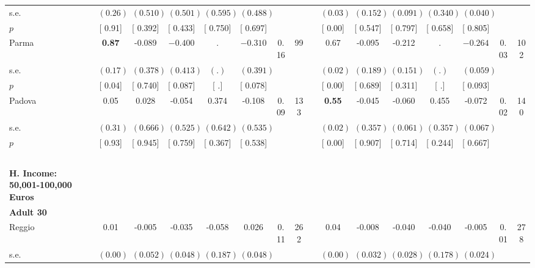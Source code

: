 \begin{longtable}{L{8em} c c c c c c c p{1em} c c c c c c c}
\quad \quad \quad \quad s.e.& $ (     0.26)$ & $ (    0.510)$ & $ (    0.501)$ & $ (    0.595)$ & $ (    0.488)$ & & & & $ (     0.03)$ & $ (    0.152)$ & $ (    0.091)$ & $ (    0.340)$ & $ (    0.040)$ & &  \\*
\quad \quad \quad \quad $ p$ & [     0.91] & [    0.392] & [    0.433] & [    0.750] & [    0.697] & & & & [     0.00] & [    0.547] & [    0.797] & [    0.658] & [    0.805] & &  \\[1em]
\quad \quad \quad Parma& \textbf{     0.87} &    -0.089 & $ \mathbf{   -0.400}$ &         . & $ \mathbf{   -0.310}$ &      0.16 &        99 & & 0.67 &    -0.095 &    -0.212 &         . & $ \mathbf{   -0.264}$ &      0.03 &       102  \\*
\quad \quad \quad \quad s.e.& $ (     0.17)$ & $ (    0.378)$ & $ (    0.413)$ & $ (        .)$ & $ (    0.391)$ & & & & $ (     0.02)$ & $ (    0.189)$ & $ (    0.151)$ & $ (        .)$ & $ (    0.059)$ & &  \\*
\quad \quad \quad \quad $ p$ & [     0.04] & [    0.740] & [    0.087] & [        .] & [    0.078] & & & & [     0.00] & [    0.689] & [    0.311] & [        .] & [    0.093] & &  \\[1em]
\quad \quad \quad Padova& 0.05 &     0.028 &    -0.054 &     0.374 &    -0.108 &      0.09 &       133 & & \textbf{     0.55} &    -0.045 &    -0.060 &     0.455 &    -0.072 &      0.02 &       140  \\*
\quad \quad \quad \quad s.e.& $ (     0.31)$ & $ (    0.666)$ & $ (    0.525)$ & $ (    0.642)$ & $ (    0.535)$ & & & & $ (     0.02)$ & $ (    0.357)$ & $ (    0.061)$ & $ (    0.357)$ & $ (    0.067)$ & &  \\*
\quad \quad \quad \quad $ p$ & [     0.93] & [    0.945] & [    0.759] & [    0.367] & [    0.538] & & & & [     0.00] & [    0.907] & [    0.714] & [    0.244] & [    0.667] & &  \\[1em]
~\\[1em]
\textbf{H. Income: 50,001-100,000 Euros} \\*
\quad \quad \textbf{Adult 30} & & & & & & & & & & & & & & & \\* 
\quad \quad \quad Reggio& 0.01 &    -0.005 &    -0.035 &    -0.058 &     0.026 &      0.11 &       262 & & 0.04 &    -0.008 &    -0.040 &    -0.040 &    -0.005 &      0.01 &       278  \\*
\quad \quad \quad \quad s.e.& $ (     0.00)$ & $ (    0.052)$ & $ (    0.048)$ & $ (    0.187)$ & $ (    0.048)$ & & & & $ (     0.00)$ & $ (    0.032)$ & $ (    0.028)$ & $ (    0.178)$ & $ (    0.024)$ & &  \\*

\end{longtable}
